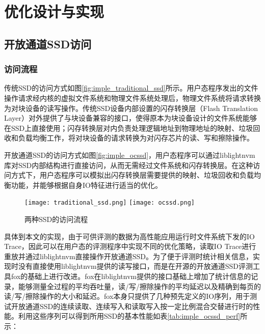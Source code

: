 \chapter{优化设计与实现}
\label{cha:imple}

\section{开放通道SSD访问}
\subsection{访问流程}
传统SSD的访问方式如图\ref{fig:imple_traditional_ssd}所示。用户态程序发出的文件操作请求经内核的虚拟文件系统和物理文件系统处理后，物理文件系统将请求转换为对块设备的读写操作。传统SSD设备内部设置的闪存转换层（Flash Translation Layer）对外提供了与块设备兼容的接口，使得原本为块设备设计的文件系统能够在SSD上直接使用；闪存转换层对内负责处理逻辑地址到物理地址的映射、垃圾回收和负载均衡工作，将对块设备的请求转换为对闪存芯片的读、写和擦除操作。

开放通道SSD的访问方式如图\ref{fig:imple_ocssd}，用户态程序可以通过liblightnvm库对SSD内部结构进行直接访问，从而无需经过文件系统和闪存转换层。在这种访问方式下，用户态程序可以模拟出闪存转换层需要提供的映射、垃圾回收和负载均衡功能，并能够根据自身IO特征进行适当的优化。

\begin{figure}[H]
    \centering
      {\texttt{[image: traditional\_ssd.png]}}
    \hspace{4em}
        {\texttt{[image: ocssd.png]}}
    \caption{两种SSD的访问流程}
    \label{fig:imple_ssdvisit}
\end{figure}

具体到本文的实现，由于可供评测的数据为高性能应用运行时文件系统下发的IO Trace，因此可以在用户态的评测程序中实现不同的优化策略，读取IO Trace进行重放并通过liblightnvm直接操作开放通道SSD。为了便于评测时统计相关信息，实现时没有直接使用liblightnvm提供的读写接口，而是在开源的开放通道SSD评测工具fox的基础上进行改进。fox在liblightnvm提供的接口基础上增加了统计信息的记录，能够测量全过程的平均吞吐量，读/写/擦除操作的平均延迟以及精确到每页的读/写/擦除操作的大小和延迟。fox本身只提供了几种预先定义的IO序列，用于测试开放通道SSD的连续读取、连续写入和读取写入按一定比例混合交替进行时的性能。利用这些序列可以得到所用SSD的基本性能如表\ref{tab:imple_ocssd_perf}所示：

